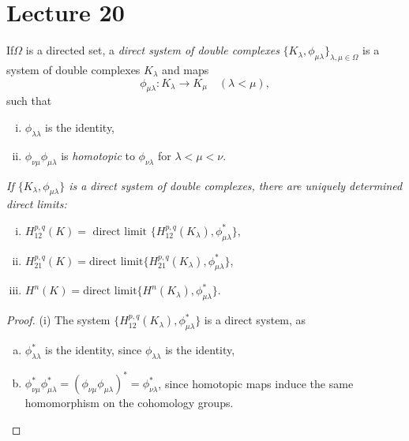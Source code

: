 \chapter{Lecture 20}\label{chap20:lec20}
  
\begin{defi*}%
If\pageoriginale $\Omega$ is a directed set, a {\em direct system of double
  complexes} $\bigg\{ K_\lambda , \phi_{\mu \lambda} \bigg\}_{\lambda
  , \mu \in \Omega}$ is a system of double complexes $K_\lambda$ and
maps 
$$
\phi_{\mu \lambda} : K_\lambda \rightarrow K_\mu \quad{(\lambda <
  \mu)}, 
$$
such that 
\begin{enumerate}[(i)]
\item $\phi_{\lambda \lambda}$ is the identity, 

\item $\phi_{\nu \mu} \phi_{\mu \lambda}$ is {\em homotopic} to
  $\phi_{\nu \lambda}$ for $\lambda < \mu < \nu$. 
\end{enumerate}
  \end{defi*}  
  
\textit{If $\bigg\{ K_{\lambda}, \phi_{\mu \lambda} \bigg\}$ is a
  direct system of double complexes, there are unique\-ly determined
  direct limits:} 
  \begin{enumerate}[(i)]
\item $H^{p,q}_{12}(K ) = \text { direct limit } \{
  H^{p,q}_{12}(K_\lambda), \phi^*_{\mu \lambda} \}$, 

\item $H^{p,q}_{21}(K ) = \text {direct limit} \{
  H^{p,q}_{21}(K_\lambda), \phi^*_{\mu \lambda} \}$, 

\item $H^n (K) = \text {direct limit} \{ H^n (K_\lambda), \phi^*_{\mu
  \lambda} \}$. 
  \end{enumerate}  
  
  \begin{proof}
(i) The system $\bigg\{ H^{p,q}_{12}(K_\lambda), \phi^*_{\mu
      \lambda} \bigg\}$ is a direct system, as  
\begin{enumerate}[(a)]
\item $\phi^\ast_{\lambda \lambda}$ is the identity, since $\phi_{\lambda
  \lambda}$ is the identity, 

\item $\phi^\ast_{\nu \mu} \phi^\ast_{\mu \lambda} = (\phi_{\nu \mu}
  \phi_{\mu \lambda})^\ast = \phi^\ast_{\nu \lambda}$, since homotopic maps
  induce the same homomorphism on the cohomology groups. 
\end{enumerate}
  \end{proof}  
  
